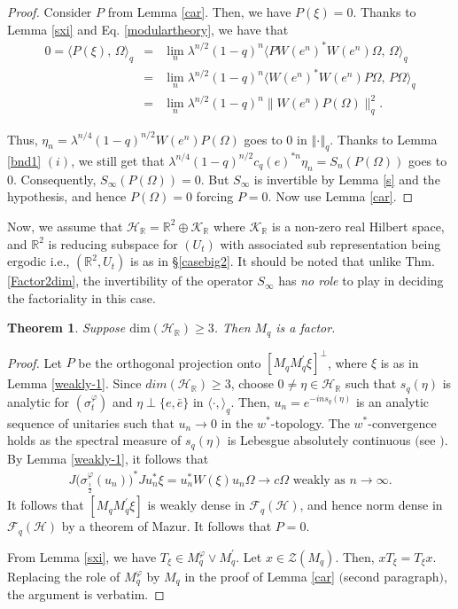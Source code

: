 \documentclass[12pt, a4paper,reqno]{amsart}
\newtheorem{Theorem}{Theorem}[section]
\theoremstyle{definition}
\renewcommand{\geq}{\geqslant}
\def\R{\mathbb R}
\newcommand{\CH}{\mathcal{H}}
\newcommand{\norm}[1]{\left\Vert#1\right\Vert}
\begin{document}
\begin{proof}
Consider $P$ from Lemma \ref{car}. Then, we have $P(\xi)=0$. Thanks to Lemma \ref{sxi} and Eq. \eqref{modulartheory}, we have that 
\begin{eqnarray*}
0=\langle P(\xi),\, \Omega\rangle_q&=& \lim_n  \lambda^{n/2}(1-q)^n 
\langle P W(e^n)^*W(e^n)\Omega,\,\Omega\rangle_q\\&=&\lim_n  \lambda^{n/2}(1-q)^n 
\langle  W(e^n)^*W(e^n)P\Omega,\,P\Omega\rangle_q\\ &=& \lim_n  \lambda^{n/2}(1-q)^n \|W(e^n)P(\Omega)\|_q^2.
\end{eqnarray*}

Thus, $\eta_n=\lambda^{n/4}(1-q)^{n/2}W(e^n)P(\Omega)$ goes to 0 in $\norm{\cdot}_q$. Thanks to Lemma \ref{bnd1} $(i)$, we still get that $\lambda^{n/4}(1-q)^{n/2}c_q(e)^{*n}\eta_n= S_n(P(\Omega))$ goes to 0. Consequently, $S_\infty(P(\Omega))=0$. But $S_\infty$ is invertible by Lemma \ref{s} and the hypothesis, and hence $P(\Omega)=0$ forcing $P=0$. Now use Lemma \ref{car}.
\end{proof}

Now, we assume that $\CH_\R= \mathbb{R}^2\oplus \mathcal{K}_\R$ where $\mathcal{K}_\R$ is a non-zero real Hilbert space, and $\mathbb{R}^2$ is reducing subspace for $(U_t)$ with associated sub representation being ergodic i.e., $(\mathbb{R}^2, U_t)$ is as in \S\ref{casebig2}. It should be noted that unlike Thm. \ref{Factor2dim}, the invertibility of the operator $S_\infty$ has \textit{no role} to play in deciding the factoriality in this case. 


\begin{Theorem}\label{gre3factor}
Suppose  $\text{dim}(\CH_\R) \geq 3$. Then $M_q$ is a factor. 	
\end{Theorem}

\begin{proof}
Let $P$ be the orthogonal projection onto $[M_q M_q^\prime\xi]^\perp$, where $\xi$ is as in Lemma  \ref{weakly-1}. Since $dim(\CH_\R)\geq 3$, choose $0\neq \eta\in \CH_\R$ such that $s_q(\eta)$ is analytic for $(\sigma_t^\varphi)$ and $\eta\perp \{e,\bar e\}$ in $\langle\cdot,\rangle_q$. Then, $u_n = e^{-in s_q(\eta)}$ is an analytic sequence of unitaries 
such that $u_n\rightarrow 0$ in the $w^*$-topology. The $w^*$-convergence holds as the spectral measure of $s_q(\eta)$ is Lebesgue absolutely continuous $($see \cite[\S4]{bik-kunal}$)$. By Lemma \ref{weakly-1}, it follows that 
\begin{align*}
J\big(\sigma_{\frac{i}{2}}^\varphi(u_n)\big)^*J u_n^* \xi=u_n^* W(\xi) u_n\Omega\rightarrow c\Omega \text{ weakly as }n\rightarrow\infty.
\end{align*}
It follows that $[M_q M_q^\prime\xi]$ is weakly dense in $\mathcal{F}_q(\CH)$, and hence norm dense in $\mathcal{F}_q(\CH)$ by a theorem of Mazur. It follows that $P=0$. 

From Lemma \ref{sxi}, we have $T_\xi\in M_q^\varphi\vee M_q^\prime$. Let $x\in \mathcal{Z}(M_q)$. Then, $xT_\xi = T_\xi x$. Replacing the role of $M_q^\varphi$ by $M_q$ in the proof of Lemma \ref{car} $($second paragraph$)$, the argument is verbatim. 
\end{proof}	
\end{document}
